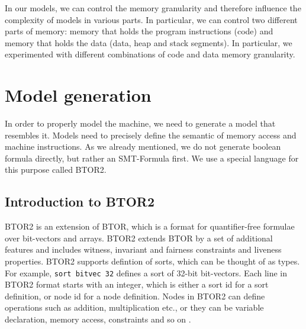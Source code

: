 \documentclass[12pt]{article}
\begin{document}
In our models, we can control the memory granularity and therefore influence
the complexity of models in various parts. In particular, we can control two
different parts of memory: memory that holds the program instructions (code)
and memory that holds the data (data, heap and stack segments). In particular,
we experimented with different combinations of code and data memory
granularity.


\section{Model generation}

In order to properly model the machine, we need to generate a model that
resembles it. Models need to precisely define the semantic of memory access and
machine instructions. As we already mentioned, we do not generate boolean
formula directly, but rather an SMT-Formula first. We use a special language
for this purpose called BTOR2.

\subsection{Introduction to BTOR2}

BTOR2 is an extension of BTOR, which is a format for quantifier-free formulae
over bit-vectors and arrays. BTOR2 extends BTOR by a set of additional features
and includes witness, invariant and fairness constraints and liveness
properties. BTOR2 supports defintion of sorts, which can be thought of as
types. For example, \texttt{sort bitvec 32} defines a sort of 32-bit
bit-vectors. Each line in BTOR2 format starts with an integer, which is either
a sort id for a sort definition, or node id for a node definition. Nodes in
BTOR2 can define operations such as addition, multiplication etc., or they can
be variable declaration, memory access, constraints and so on \cite{btor2}.
\end{document}
